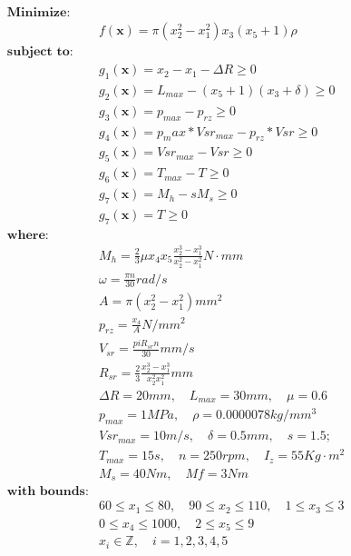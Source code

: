 \begin{align*}
\textbf{Minimize:} & \\
& f(\bm{x}) = \pi(x_2^2 - x_1^2) x_3 (x_5 + 1) \rho \\[0.5em]
\textbf{subject to:} & \\
& g_1(\bm{x}) = x_2 - x_1 - \Delta R \geq 0 \\
& g_2(\bm{x}) = L_{max} - (x_5 + 1) (x_3 + \delta) \geq 0 \\
& g_3(\bm{x}) = p_{max} - p_{rz} \geq 0 \\
& g_4(\bm{x}) = p_max * Vsr_{max} - p_{rz} * Vsr \geq 0 \\
& g_5(\bm{x}) = Vsr_{max} - Vsr \geq 0 \\
& g_6(\bm{x}) = T_{max} - T \geq 0 \\
& g_7(\bm{x}) = M_h - s  M_s \geq 0 \\
& g_7(\bm{x}) = T \geq 0 \\[0.5em]
\textbf{where:} & \\
& M_h = \frac{2}{3} \mu x_4 x_5 \frac{x_2^3 - x_1^3}{x_2^2 - x_1^2} N \cdot mm  \\
& \omega = \frac{\pi n}{30} rad/s  \\
& A = \pi (x_2^2 - x_1^2) mm^2  \\
& p_{rz} = \frac{x_4}{A} N/mm^2 \\
& V_{sr} = \frac{pi R_{sr} n}{30} mm /s \\
& R_{sr} = \frac{2}{3} \frac{x_2^3 - x_1^3}{x_2^2 x_1^2} mm \\
& \Delta R = 20mm, \quad L_{max} = 30mm, \quad \mu = 0.6 \\
& p_{max} = 1MPa, \quad \rho = 0.0000078kg/mm^3 \\
& Vsr_{max} = 10m/s, \quad \delta = 0.5mm, \quad s = 1.5; \\
& T_{max} = 15s, \quad n = 250rpm, \quad I_{z} = 55Kg \cdot m^2 \\
& M_s = 40Nm, \quad Mf = 3Nm \\[0.5em]
\textbf{with bounds:} & \\
& 60 \leq x_1 \leq 80, \quad 90 \leq x_2 \leq 110, \quad 1 \leq x_3 \leq 3 \\
& 0 \leq x_4 \leq 1000, \quad 2 \leq x_5 \leq 9 \\
& x_i \in \mathbb{Z}, \quad i = 1, 2, 3, 4, 5
\end{align*}